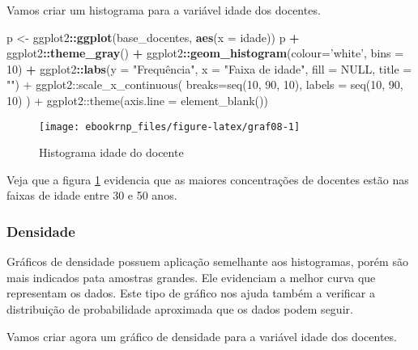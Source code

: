 \documentclass[12pt,]{style/krantz}
\makeatletter
\newenvironment{Shaded}{\begin{snugshade}}{\end{snugshade}}
\newcommand{\KeywordTok}[1]{\textcolor[rgb]{0.13,0.29,0.53}{\textbf{#1}}}
\newcommand{\DataTypeTok}[1]{\textcolor[rgb]{0.13,0.29,0.53}{#1}}
\newcommand{\DecValTok}[1]{\textcolor[rgb]{0.00,0.00,0.81}{#1}}
\newcommand{\StringTok}[1]{\textcolor[rgb]{0.31,0.60,0.02}{#1}}
\newcommand{\OperatorTok}[1]{\textcolor[rgb]{0.81,0.36,0.00}{\textbf{#1}}}
\newcommand{\NormalTok}[1]{#1}
\newenvironment{kframe}{%
\medskip{}
\setlength{\fboxsep}{.8em}
 \def\at@end@of@kframe{}%
 \ifinner\ifhmode%
  \def\at@end@of@kframe{\end{minipage}}%
  \begin{minipage}{\columnwidth}%
 \fi\fi%
 \def\FrameCommand##1{\hskip\@totalleftmargin \hskip-\fboxsep
 \colorbox{shadecolor}{##1}\hskip-\fboxsep
     \hskip-\linewidth \hskip-\@totalleftmargin \hskip\columnwidth}%
 \MakeFramed {\advance\hsize-\width
   \@totalleftmargin\z@ \linewidth\hsize
   \@setminipage}}%
 {\par\unskip\endMakeFramed%
 \at@end@of@kframe}
\renewenvironment{Shaded}{\begin{kframe}}{\end{kframe}}
\theoremstyle{definition}
\theoremstyle{definition}
\theoremstyle{definition}
\theoremstyle{remark}
\let\BeginKnitrBlock\begin \let\EndKnitrBlock\end
\makeatother
\begin{document}
\BeginKnitrBlock{example}
\protect\hypertarget{exm:unnamed-chunk-75}{}{\label{exm:unnamed-chunk-75}
}Vamos criar um histograma para a variável idade dos docentes.
\EndKnitrBlock{example}

\begin{Shaded}
\begin{Highlighting}[]
\NormalTok{p <-}\StringTok{ }\NormalTok{ggplot2}\OperatorTok{::}\KeywordTok{ggplot}\NormalTok{(base_docentes, }\KeywordTok{aes}\NormalTok{(}\DataTypeTok{x =}\NormalTok{ idade))}
\NormalTok{p }\OperatorTok{+}\StringTok{ }\NormalTok{ggplot2}\OperatorTok{::}\KeywordTok{theme_gray}\NormalTok{() }\OperatorTok{+}
\StringTok{  }\NormalTok{ggplot2}\OperatorTok{::}\KeywordTok{geom_histogram}\NormalTok{(}\DataTypeTok{colour=}\StringTok{'white'}\NormalTok{, }\DataTypeTok{bins =} \DecValTok{10}\NormalTok{) }\OperatorTok{+}
\StringTok{  }\NormalTok{ggplot2}\OperatorTok{::}\KeywordTok{labs}\NormalTok{(}\DataTypeTok{y =} \StringTok{"Frequência", x = "}\NormalTok{Faixa de idade}\StringTok{", fill = NULL, title = "") +}
\StringTok{    ggplot2::scale_x_continuous(}
\StringTok{      breaks=seq(10, 90, 10),}
\StringTok{      labels = seq(10, 90, 10)}
\StringTok{    ) +}
\StringTok{  ggplot2::theme(axis.line = element_blank())}
\end{Highlighting}
\end{Shaded}

\begin{figure}[H]

{\centering \texttt{[image: ebookrnp\_files/figure-latex/graf08-1]} 

}

\caption{Histograma idade do docente}\label{fig:graf08}
\end{figure}

Veja que a figura \ref{fig:graf08} evidencia que as maiores
concentrações de docentes estão nas faixas de idade entre 30 e 50 anos.

\subsubsection{Densidade}\label{densidade}

Gráficos de densidade possuem aplicação semelhante aos histogramas,
porém são mais indicados pata amostras grandes. Ele evidenciam a melhor
curva que representam os dados. Este tipo de gráfico nos ajuda também a
verificar a distribuição de probabilidade aproximada que os dados podem
seguir.

\BeginKnitrBlock{example}
\protect\hypertarget{exm:unnamed-chunk-76}{}{\label{exm:unnamed-chunk-76}
}Vamos criar agora um gráfico de densidade para a variável idade dos
docentes.
\EndKnitrBlock{example}
\end{document}
